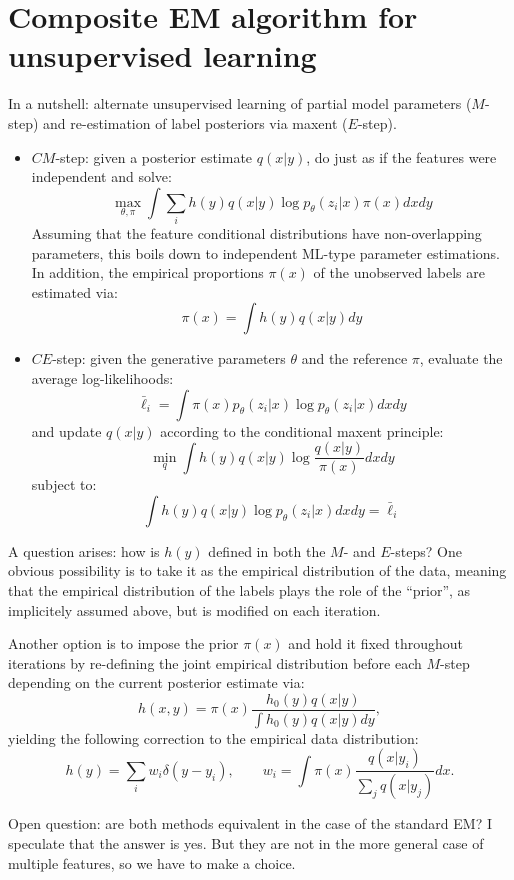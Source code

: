 \documentclass{article}
\begin{document}
\section{Composite EM algorithm for unsupervised learning}
\label{sec:gem}

In a nutshell: alternate unsupervised learning of partial model parameters ($M$-step) and re-estimation of label posteriors via maxent ($E$-step). 

\begin{itemize}
\item $CM$-step: given a posterior estimate $q(x|y)$, do just as if the features were independent and solve: 
$$
\max_{\theta,\pi}
\int \sum_i h(y)q(x|y) \log p_\theta(z_i|x)\pi(x) dx dy
$$
Assuming that the feature conditional distributions have non-overlapping parameters, this boils down to independent ML-type parameter estimations. In addition, the empirical proportions $\pi(x)$ of the unobserved labels are estimated via:
$$
\pi(x) = \int h(y)q(x|y) dy
$$
\item $CE$-step: given the generative parameters $\theta$ and the reference $\pi$, evaluate the average log-likelihoods:
$$
\bar{\ell}_i
= \int \pi(x)p_\theta(z_i|x)\log p_\theta(z_i|x) dx dy
$$
and update $q(x|y)$ according to the conditional maxent principle:
$$
\min_q
\int h(y)q(x|y) \log \frac{q(x|y)}{\pi(x)} dx dy
$$
subject to:
$$
\int h(y)q(x|y)\log p_\theta(z_i|x) dx dy = \bar{\ell}_i
$$
\end{itemize}

A question arises: how is $h(y)$ defined in both the $M$- and $E$-steps? One obvious possibility is to take it as the empirical distribution of the data, meaning that the empirical distribution of the labels plays the role of the ``prior'', as implicitely assumed above, but is modified on each iteration. 

Another option is to impose the prior $\pi(x)$ and hold it fixed throughout iterations by re-defining the joint empirical distribution before each $M$-step depending on the current posterior estimate via:
$$
h(x,y)=\pi(x)\frac{h_0(y)q(x|y)}{\int h_0(y)q(x|y) dy} ,
$$
yielding the following correction to the empirical data distribution:
$$
h(y) = \sum_i w_i\delta(y-y_i),
\qquad
w_i = \int \pi(x)\frac{q(x|y_i)}{\sum_j q(x|y_j)} dx
.
$$

Open question: are both methods equivalent in the case of the standard EM? I speculate that the answer is yes. But they are not in the more general case of multiple features, so we have to make a choice. 
\end{document}
